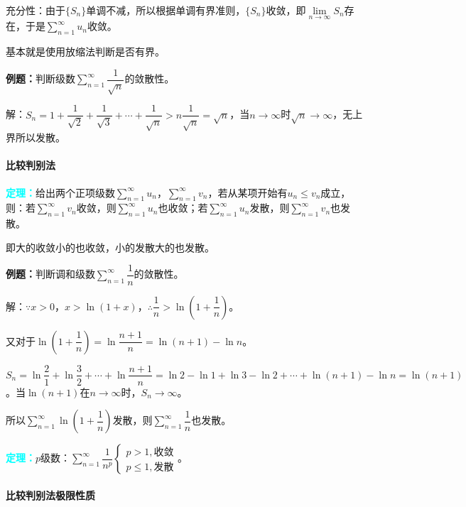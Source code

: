 \documentclass[UTF8, 12pt]{ctexart}
\begin{document}
充分性：由于$\{S_n\}$单调不减，所以根据单调有界准则，$\{S_n\}$收敛，即$\lim\limits_{n\to\infty}S_n$存在，于是$\sum\limits_{n=1}^\infty u_n$收敛。

基本就是使用放缩法判断是否有界。

\textbf{例题：}判断级数$\sum\limits_{n=1}^\infty\dfrac{1}{\sqrt{n}}$的敛散性。

解：$S_n=1+\dfrac{1}{\sqrt{2}}+\dfrac{1}{\sqrt{3}}+\cdots+\dfrac{1}{\sqrt{n}}>n\dfrac{1}{\sqrt{n}}=\sqrt{n}$，当$n\to\infty$时$\sqrt{n}\to\infty$，无上界所以发散。

\paragraph{比较判别法} \leavevmode \medskip

\textcolor{aqua}{\textbf{定理：}}给出两个正项级数$\sum\limits_{n=1}^\infty u_n$，$\sum\limits_{n=1}^\infty v_n$，若从某项开始有$u_n\leqslant v_n$成立，则：若$\sum\limits_{n=1}^\infty v_n$收敛，则$\sum\limits_{n=1}^\infty u_n$也收敛；若$\sum\limits_{n=1}^\infty u_n$发散，则$\sum\limits_{n=1}^\infty v_n$也发散。

即大的收敛小的也收敛，小的发散大的也发散。

\textbf{例题：}判断调和级数$\sum\limits_{n=1}^\infty\dfrac{1}{n}$的敛散性。

解：$\because x>0$，$x>\ln(1+x)$，$\therefore\dfrac{1}{n}>\ln\left(1+\dfrac{1}{n}\right)$。

又对于$\ln\left(1+\dfrac{1}{n}\right)=\ln\dfrac{n+1}{n}=\ln(n+1)-\ln n$。

$S_n=\ln\dfrac{2}{1}+\ln\dfrac{3}{2}+\cdots+\ln\dfrac{n+1}{n}=\ln2-\ln1+\ln3-\ln2+\cdots+\ln(n+1)-\ln n=\ln(n+1)$。当$\ln(n+1)$在$n\to\infty$时，$S_n\to\infty$。

所以$\sum\limits_{n=1}^\infty\ln\left(1+\dfrac{1}{n}\right)$发散，则$\sum\limits_{n=1}^\infty\dfrac{1}{n}$也发散。

\textcolor{aqua}{\textbf{定理：}}$p$级数：$\sum\limits_{n=1}^\infty\dfrac{1}{n^p}\left\{\begin{array}{l}
    p>1, \text{收敛} \\
    p\leqslant1, \text{发散}
\end{array}\right.$。

\paragraph{比较判别法极限性质} \leavevmode \medskip
\end{document}
